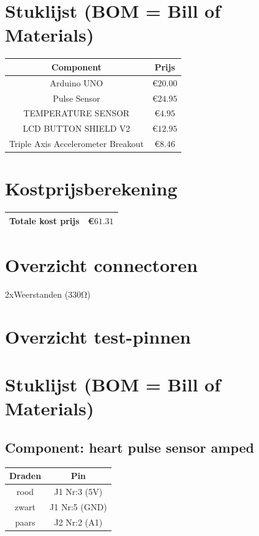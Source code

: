 \documentclass[a4paper]{report}
\begin{document}
    \section{Stuklijst (BOM = Bill of Materials)}
        \begin{tabular}{|c|c|}
            \hline
            Component & Prijs\\
            \hline
            Arduino UNO                        & \euro $20.00$\\
            Pulse Sensor                       & \euro $24.95$\\
            TEMPERATURE SENSOR                 & \euro $4.95$\\
            LCD BUTTON SHIELD V2               & \euro $12.95$\\
            Triple Axis Accelerometer Breakout & \euro $8.46$\\
            \hline
        \end{tabular}
        
    \section{Kostprijsberekening}
        \begin{tabular}{|c|c|}
            \hline
            Totale kost prijs & \euro $61.31$\\
            \hline
        \end{tabular}
        
    \section{Overzicht connectoren}
    2xWeerstanden ($330\si\ohm$)
    
    \section{Overzicht test-pinnen}

    \section{Stuklijst (BOM = Bill of Materials)}
    
        \subsection{Component: heart pulse sensor amped}
            \begin{tabular}{|c|c|}
                \hline
                Draden & Pin\\
                \hline
                rood  & J1 Nr:3 (5V)\\
                zwart & J1 Nr:5 (GND)\\
                paars & J2 Nr:2 (A1)\\
                \hline
            \end{tabular}
\end{document}
